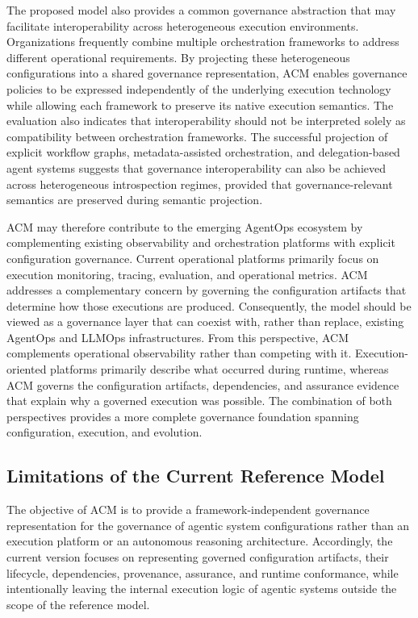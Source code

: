 \documentclass[10pt]{article}
\begin{document}
The proposed model also provides a common governance abstraction that may facilitate interoperability across heterogeneous execution environments. Organizations frequently combine multiple orchestration frameworks to address different operational requirements. By projecting these heterogeneous configurations into a shared governance representation, ACM enables governance policies to be expressed independently of the underlying execution technology while allowing each framework to preserve its native execution semantics. 
The evaluation also indicates that interoperability should not be interpreted solely as compatibility between orchestration frameworks. The successful projection of explicit workflow graphs, metadata-assisted orchestration, and delegation-based agent systems suggests that governance interoperability can also be achieved across heterogeneous introspection regimes, provided that governance-relevant semantics are preserved during semantic projection.

ACM may therefore contribute to the emerging AgentOps ecosystem by complementing existing observability and orchestration platforms with explicit configuration governance. Current operational platforms primarily focus on execution monitoring, tracing, evaluation, and operational metrics. ACM addresses a complementary concern by governing the configuration artifacts that determine how those executions are produced. Consequently, the model should be viewed as a governance layer that can coexist with, rather than replace, existing AgentOps and LLMOps infrastructures. 
From this perspective, ACM complements operational observability rather than competing with it. Execution-oriented platforms primarily describe what occurred during runtime, whereas ACM governs the configuration artifacts, dependencies, and assurance evidence that explain why a governed execution was possible. The combination of both perspectives provides a more complete governance foundation spanning configuration, execution, and evolution.

\subsection{Limitations of the Current Reference Model}
\label{subsec:limitations}

The objective of ACM is to provide a framework-independent governance representation for the governance of agentic system configurations rather than an execution platform or an autonomous reasoning architecture. Accordingly, the current version focuses on representing governed configuration artifacts, their lifecycle, dependencies, provenance, assurance, and runtime conformance, while intentionally leaving the internal execution logic of agentic systems outside the scope of the reference model.
\end{document}

